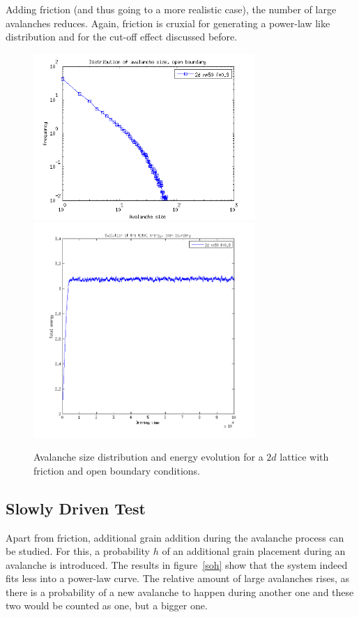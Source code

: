 Adding friction (and thus going to a more realistic case), the number of large avalanches reduces. Again, friction is cruxial for generating a power-law like distribution and for the cut-off effect discussed before.

\begin{figure}
\begin{center}
\includegraphics[width=0.75\textwidth]{results/2sof.png}
\includegraphics[width=0.75\textwidth]{results/2eof.png}
\caption{Avalanche size distribution and energy evolution for a $2d$ lattice with friction and open boundary conditions.}
\label{so}
\end{center}
\end{figure} 

\subsection{Slowly Driven Test}
Apart from friction, additional grain addition during the avalanche process can be studied. For this, a probability $h$ of an additional grain placement during an avalanche is introduced. The results in figure~\ref{soh} show that the system indeed fits less into a power-law curve. The relative amount of large avalanches rises, as there is a probability of a new avalanche to happen during another one and these two would be counted as one, but a bigger one.

